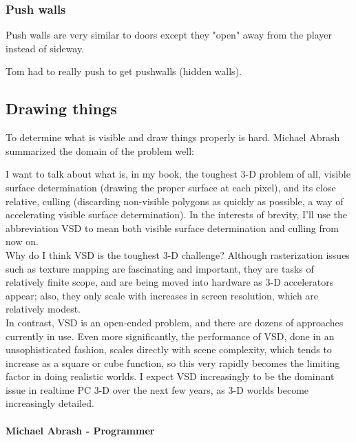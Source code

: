 \subsubsection{Push walls} 
Push walls are very similar to doors except they "open" away from the player instead of sideway.\\
\par
Tom had to really push to get pushwalls (hidden walls).\\


















\subsection{Drawing things}
To determine what is visible and draw things properly is hard. Michael Abrash summarized the domain of the problem well:\\

\begin{fancyquotes}
I want to talk about what is, in my book, the toughest 3-D problem of all, visible surface determination (drawing the proper surface at each pixel), and its close relative, culling (discarding non-visible polygons as quickly as possible, a way of accelerating visible surface determination). In the interests of brevity, I’ll use the abbreviation VSD to mean both visible surface determination and culling from now on.
 \bigskip \\
Why do I think VSD is the toughest 3-D challenge? Although rasterization issues such as texture mapping are fascinating and important, they are tasks of relatively finite scope, and are being moved into hardware as 3-D accelerators appear; also, they only scale with increases in screen resolution, which are relatively modest.
 \bigskip \\
In contrast, VSD is an open-ended problem, and there are dozens of approaches currently in use. Even more significantly, the performance of VSD, done in an unsophisticated fashion, scales directly with scene complexity, which tends to increase as a square or cube function, so this very rapidly becomes the limiting factor in doing realistic worlds. I expect VSD increasingly to be the dominant issue in realtime PC 3-D over the next few years, as 3-D worlds become increasingly detailed.
 \bigskip \\
\bigskip \\
\textbf{Michael Abrash - Programmer}
 \end{fancyquotes}
 

